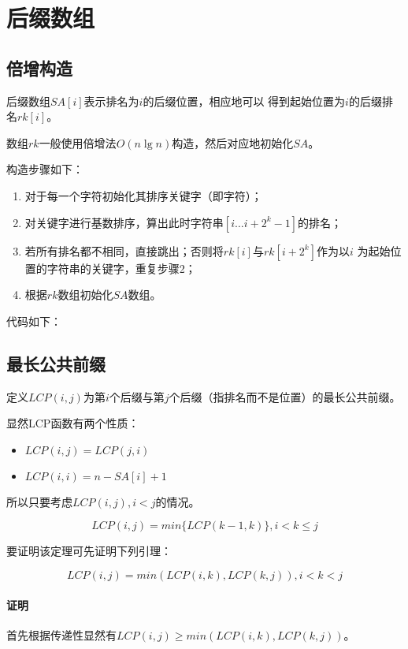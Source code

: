 \section{后缀数组}
\subsection{倍增构造}
后缀数组$SA[i]$表示排名为$i$的后缀位置，相应地可以
得到起始位置为$i$的后缀排名$rk[i]$。

数组$rk$一般使用倍增法$O(n\lg n)$构造，然后对应地初始化$SA$。

构造步骤如下：
\begin{enumerate}
    \item 对于每一个字符初始化其排序关键字（即字符）；
    \item 对关键字进行基数排序，算出此时字符串$[i\ldots i+2^k-1]$的排名；
    \item 若所有排名都不相同，直接跳出；否则将$rk[i]$与$rk[i+2^k]$作为以$i$
    为起始位置的字符串的关键字，重复步骤2；
    \item 根据$rk$数组初始化$SA$数组。
\end{enumerate}
代码如下：

\subsection{最长公共前缀}
定义$LCP(i,j)$为第$i$个后缀与第$j$个后缀（指排名而不是位置）的最长公共前缀。

显然LCP函数有两个性质：
\begin{itemize}
    \item $LCP(i,j)=LCP(j,i)$
    \item $LCP(i,i)=n-SA[i]+1$
\end{itemize}
所以只要考虑$LCP(i,j),i<j$的情况。
\begin{theorem}
    \begin{displaymath}
        LCP(i,j)=min\{LCP(k-1,k)\},i<k\leq j
    \end{displaymath}
\end{theorem}
要证明该定理可先证明下列引理：
\begin{lemma}
    \begin{displaymath}
       LCP(i,j)=min(LCP(i,k),LCP(k,j)),i<k<j
    \end{displaymath}
\end{lemma}
\paragraph{证明}
首先根据传递性显然有$LCP(i,j)\geq min(LCP(i,k),LCP(k,j))$。

